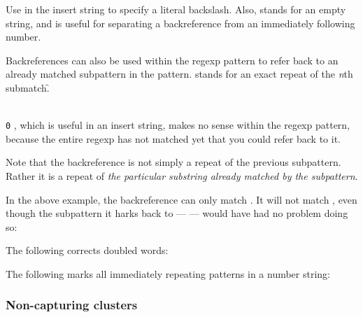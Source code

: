{Use \p{\\} in the insert string to specify a literal
backslash.  Also, \p{\$} stands for an empty string,
and is useful for separating a backreference \p{\n}
from an immediately following number.

Backreferences can also be used within the regexp
pattern to refer back to an already matched subpattern
in the pattern.  \p{\n} stands for an exact repeat
of the {\em n}th submatch.\f{\ifx\newenvironment\PLAINTEX
\p{\0}\else
{\tt\\0}\fi
, which is useful in
an insert string, makes no  sense within the regexp
pattern, because the entire regexp has not matched yet
that you could refer back to it.}


\n Note that the backreference is not simply a repeat
of the previous subpattern.  Rather it is a repeat of
{\em the particular  substring already matched by the
subpattern}.

In the above example, the backreference can only match
.  It will not match , even
though the subpattern it harks back to --- \p{([a-z]+)}
---  would have had no problem doing so:


The following corrects doubled words:


The following marks all immediately repeating patterns
in a number string:


\subsubsection{Non-capturing clusters}

}

